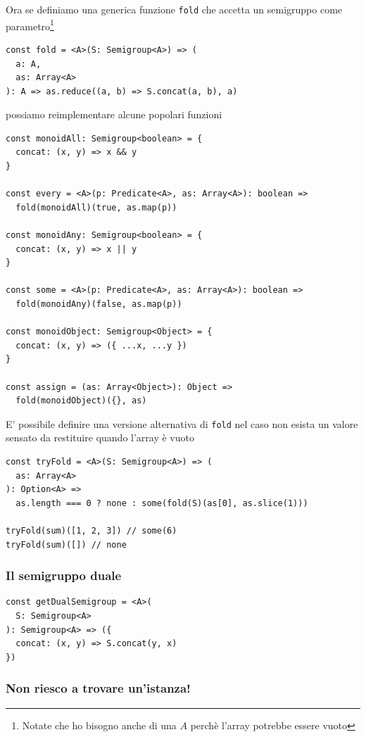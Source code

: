 \documentclass[12pt]{article}
\begin{document}
Ora se definiamo una generica funzione \texttt{fold} che accetta un semigruppo come parametro\footnote{Notate che ho bisogno anche di una $A$ perchè l'array potrebbe essere vuoto}

\begin{verbatim}
const fold = <A>(S: Semigroup<A>) => (
  a: A,
  as: Array<A>
): A => as.reduce((a, b) => S.concat(a, b), a)
\end{verbatim}

possiamo reimplementare alcune popolari funzioni

\begin{verbatim}
const monoidAll: Semigroup<boolean> = {
  concat: (x, y) => x && y
}

const every = <A>(p: Predicate<A>, as: Array<A>): boolean =>
  fold(monoidAll)(true, as.map(p))

const monoidAny: Semigroup<boolean> = {
  concat: (x, y) => x || y
}

const some = <A>(p: Predicate<A>, as: Array<A>): boolean =>
  fold(monoidAny)(false, as.map(p))

const monoidObject: Semigroup<Object> = {
  concat: (x, y) => ({ ...x, ...y })
}

const assign = (as: Array<Object>): Object =>
  fold(monoidObject)({}, as)
\end{verbatim}

E' possibile definire una versione alternativa di \texttt{fold} nel caso non esista un valore sensato da restituire quando l'array è vuoto

\begin{verbatim}
const tryFold = <A>(S: Semigroup<A>) => (
  as: Array<A>
): Option<A> =>
  as.length === 0 ? none : some(fold(S)(as[0], as.slice(1)))

tryFold(sum)([1, 2, 3]) // some(6)
tryFold(sum)([]) // none
\end{verbatim}

\subsubsection{Il semigruppo duale}

\begin{verbatim}
const getDualSemigroup = <A>(
  S: Semigroup<A>
): Semigroup<A> => ({
  concat: (x, y) => S.concat(y, x)
})
\end{verbatim}

\subsubsection{Non riesco a trovare un'istanza!}
\end{document}
